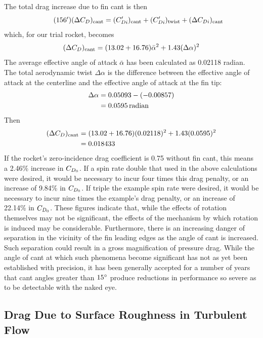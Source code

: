 The total drag increase due to fin cant is then
\begin{equation*}\tag{156$'$}\label{ch3:eq:n156}
(\Delta C_{D})_{\mathrm{cant}} = (C_{Di}')_{\mathrm{cant}} + (C_{Di}')_{\mathrm{twist}}
+ (\Delta C_{Di})_{\mathrm{cant}}
\end{equation*}
which, for our trial rocket, becomes
\begin{equation*}
(\Delta C_{D})_{\mathrm{cant}} = (13.02 + 16.76)\bar{\alpha}^2 + 1.43(\Delta\alpha)^2
\end{equation*}
The average effective angle of attack $\bar{\alpha}$ has been calculated as 0.02118 radian. The
total aerodynamic twist $\Delta\alpha$ is the difference between the effective angle of attack at
the centerline and the effective angle of attack at the fin tip:
\begin{align*}
\Delta\alpha &= 0.05093 - (-0.00857)\\
&= 0.0595\,\mathrm{radian}
\end{align*}
Then
\begin{align*}
(\Delta C_{D})_{\mathrm{cant}} &= (13.02 + 16.76)(0.02118)^2 + 1.43(0.0595)^2\\
&= 0.018433
\end{align*}
If the rocket's zero-incidence drag coefficient is 0.75 without fin cant, this means a 2.46\%
increase in $C_{D_0}$. If a spin rate double that used in the above calculations were desired, it
would be necessary to incur four times this drag penalty, or an increase of 9.84\% in $C_{D_0}$. If
triple the example spin rate were desired, it would be necessary to incur nine times the example's
drag penalty, or an increase of 22.14\% in $C_{D_0}$. These figures indicate that, while the effects
of rotation themselves may not be significant, the effects of the mechanism by which rotation is
induced may be considerable. Furthermore, there is an increasing danger of separation in the vicinity
of the fin leading edges as the angle of cant is increased. Such separation could result in a
gross magnification of pressure drag. While the angle of cant at which such phenomena become
significant has not as yet been established with precision, it has been generally accepted for a
number of years that cant angles greater than $15^{\circ}$ produce reductions in performance so severe
as to be detectable with the naked eye.

\subsection{Drag Due to Surface Roughness in Turbulent Flow}\label{ch3:sec:5.4}

